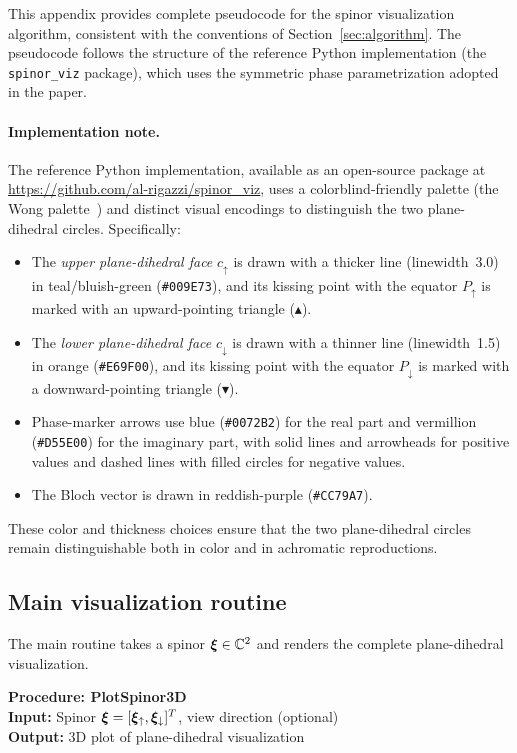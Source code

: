 This appendix provides complete pseudocode for the spinor visualization algorithm, consistent with the conventions of Section~\ref{sec:algorithm}. The pseudocode follows the structure of the reference Python implementation (the \texttt{spinor\_viz} package), which uses the symmetric phase parametrization adopted in the paper.

\paragraph{Implementation note.}
The reference Python implementation, available as an open-source package at \url{https://github.com/al-rigazzi/spinor_viz}, uses a colorblind-friendly palette (the Wong palette~\cite{wong2011points}) and distinct visual encodings to distinguish the two plane-dihedral circles.
Specifically:
\begin{itemize}
    \item The \emph{upper plane-dihedral face} $c_\uparrow$ is drawn with a thicker line (linewidth~3.0) in teal/bluish-green (\texttt{\#009E73}), and its kissing point with the equator $P_\uparrow$ is marked with an upward-pointing triangle ($\blacktriangle$).
    \item The \emph{lower plane-dihedral face} $c_\downarrow$ is drawn with a thinner line (linewidth~1.5) in orange (\texttt{\#E69F00}), and its kissing point with the equator $P_\downarrow$ is marked with a downward-pointing triangle ($\blacktriangledown$).
    \item Phase-marker arrows use blue (\texttt{\#0072B2}) for the real part and vermillion (\texttt{\#D55E00}) for the imaginary part, with solid lines and arrowheads for positive values and dashed lines with filled circles for negative values.
    \item The Bloch vector is drawn in reddish-purple (\texttt{\#CC79A7}).
\end{itemize}
These color and thickness choices ensure that the two plane-dihedral circles remain distinguishable both in color and in achromatic reproductions.


\subsection{Main visualization routine}

The main routine takes a spinor $\bm{\xi} \in \mathbb{C}^2$ and renders the complete plane-dihedral visualization.

\medskip
\noindent\textbf{Procedure: PlotSpinor3D}\\
\textbf{Input:} Spinor $\bm{\xi} = [\bm{\xi}_\uparrow, \bm{\xi}_\downarrow]^T$, view direction (optional)\\
\textbf{Output:} 3D plot of plane-dihedral visualization

